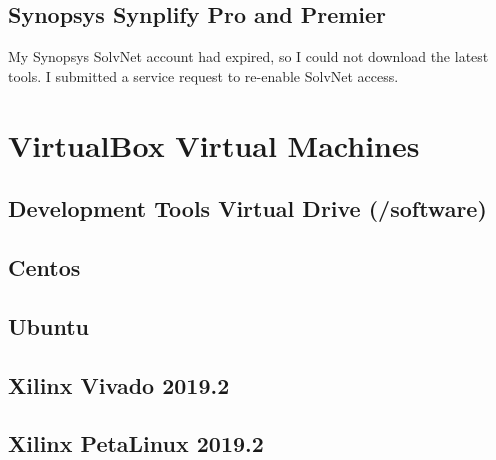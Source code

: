 \documentclass[10pt,twoside]{article}
\begin{document}
\subsection{Synopsys Synplify Pro and Premier}

My Synopsys SolvNet account had expired, so I could not download the latest
tools. I submitted a service request to re-enable SolvNet access.

\clearpage
\section{VirtualBox Virtual Machines}

\subsection{Development Tools Virtual Drive (/software)}

\subsection{Centos}

\subsection{Ubuntu}

\subsection{Xilinx Vivado 2019.2}

\subsection{Xilinx PetaLinux 2019.2}
\end{document}

